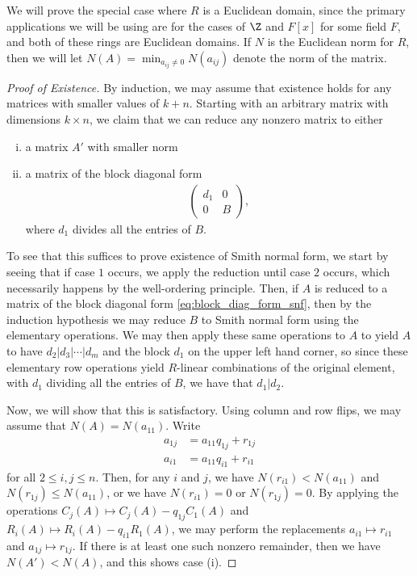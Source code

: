\documentclass[10pt]{mypackage}
\begin{document}
We will prove the special case where $R$ is a Euclidean domain, since the primary applications we will be using are for the cases of $\Z$ and $F[x]$ for some field $F$, and both of these rings are Euclidean domains. If $N$ is the Euclidean norm for $R$, then we will let $N(A) = \min_{a_{ij}\neq 0}N\left( a_{ij} \right)$ denote the norm of the matrix.
\begin{proof}[Proof of Existence]
  By induction, we may assume that existence holds for any matrices with smaller values of $k + n$. Starting with an arbitrary matrix with dimensions $k\times n$, we claim that we can reduce any nonzero matrix to either
  \begin{enumerate}[(i)]
    \item a matrix $A'$ with smaller norm
    \item a matrix of the block diagonal form
      \begin{align*}
        \begin{pmatrix}d_1 & 0 \\ 0 & B\end{pmatrix},\label{eq:block_diag_form_snf}\tag{$\dag$}
      \end{align*}
      where $d_1$ divides all the entries of $B$.
  \end{enumerate}
  To see that this suffices to prove existence of Smith normal form, we start by seeing that if case $1$ occurs, we apply the reduction until case $2$ occurs, which necessarily happens by the well-ordering principle. Then, if $A$ is reduced to a matrix of the block diagonal form \eqref{eq:block_diag_form_snf}, then by the induction hypothesis we may reduce $B$ to Smith normal form using the elementary operations. We may then apply these same operations to $A$ to yield $A$ to have $d_2 | d_3 |\cdots | d_m$ and the block $d_1$ on the upper left hand corner, so since these elementary row operations yield $R$-linear combinations of the original element, with $d_1$ dividing all the entries of $B$, we have that $d_1 | d_2$.

  Now, we will show that this is satisfactory. Using column and row flips, we may assume that $N\left( A \right) = N\left( a_{11} \right)$. Write
  \begin{align*}
    a_{1j} &= a_{11}q_{1j} + r_{1j}\\
    a_{i1} &= a_{11}q_{i1} + r_{i1}
  \end{align*}
  for all $2\leq i,j\leq n$. Then, for any $i$ and $j$, we have $N\left( r_{i1} \right) < N\left( a_{11} \right)$ and $N\left( r_{1j} \right)\leq N\left( a_{11} \right)$, or we have $N\left( r_{i1} \right) = 0$ or $N\left( r_{1j} \right) = 0$. By applying the operations $C_j(A) \mapsto C_j(A) - q_{1j}C_1(A)$ and $R_i(A) \mapsto R_i(A) - q_{i1}R_1(A)$, we may perform the replacements $a_{i1}\mapsto r_{i1}$ and $a_{1j}\mapsto r_{1j}$. If there is at least one such nonzero remainder, then we have $N\left( A' \right) < N(A)$, and this shows case (i).


\end{proof}
\end{document}
